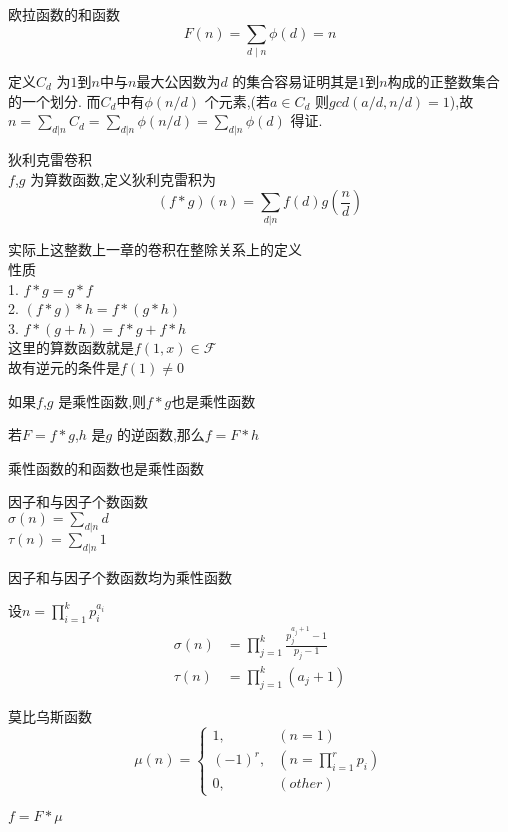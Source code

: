 \begin{proposition}
  欧拉函数的和函数
  $$
  F(n)=\sum_{d \mid n} \phi(d)=n
  $$
\end{proposition}

\begin{proposition}
  定义$C_d$ 为$1$到$n$中与$n$最大公因数为$d$ 的集合容易证明其是$1$到$n$构成的正整数集合的一个划分.
而$C_d$中有$\phi(n/d) $ 个元素,(若$a\in C_d$ 则$ gcd(a/d,n/d)=1 $),故$n=\sum_{d|n}C_d=\sum_{d|n}\phi(n/d)=\sum_{d|n}\phi(d)$ 得证.
\end{proposition}

\begin{definition}
  狄利克雷卷积\\
  $f$,$g$ 为算数函数,定义狄利克雷积为
  $$
  (f*g)(n)=\sum_{d|n}f(d)g\left(\frac{n}{d} \right)
  $$
\end{definition}
实际上这整数上一章的卷积在整除关系上的定义\\


性质\\
1. $f*g=g*f$\\
2. $(f*g)*h=f*(g*h) $\\
3. $f*(g+h)=f*g+f*h $\\

这里的算数函数就是$f(1,x)\in \mathcal{F}$\\
故有逆元的条件是$f(1)\neq 0$\\

\begin{theorem}
  如果$f$,$g$ 是乘性函数,则$f*g$也是乘性函数
\end{theorem}


\begin{theorem}
  若$F=f*g$,$h$ 是$g$ 的逆函数,那么$f=F*h$
\end{theorem}

\begin{theorem}
  乘性函数的和函数也是乘性函数
\end{theorem}

\begin{definition}
  因子和与因子个数函数\\
  $\sigma(n)=\sum_{d|n} d $\\
  $\tau(n)=\sum_{d|n}1 $
\end{definition}

\begin{proposition}
  因子和与因子个数函数均为乘性函数
\end{proposition}

\begin{proposition}
  设$n=\prod_{i=1}^{k} p_i^{a_i}$\\
  \[
    \begin{aligned}
      \sigma(n)&=\prod_{j=1}^{k} \frac{p_j^{a_j+1}-1}{p_j-1}\\
      \tau(n)&=\prod_{j=1}^{k} (a_j+1)
    \end{aligned}
  \]
\end{proposition}


\begin{definition}
  莫比乌斯函数\\
  \[
  \mu(n)=\begin{cases}
    1,& (n=1)\\
    (-1)^r,& (n=\prod_{i=1}^{r}p_i)\\
    0,& (other)
    \end{cases}
  \]
\end{definition}

\begin{theorem}
  $f=F*\mu$
\end{theorem}